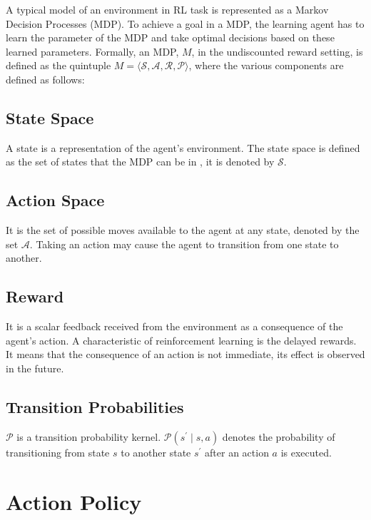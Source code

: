 A typical model of an environment in RL task is represented as a Markov Decision Processes (MDP).
To achieve a goal in a MDP, the learning agent has to learn the parameter of the MDP and take optimal decisions based on these learned parameters.
Formally, an MDP, $M$, in the undiscounted reward setting, is defined as the quintuple $M = \langle \mathcal{S}, \mathcal{A}, \mathcal{R}, \mathcal{P} \rangle$, where the various components are defined as follows:

\subsection{State Space}

A state is a representation of the agent's environment.
The state space is defined as the set of states that the MDP can be in , it is denoted by $\mathcal{S}$.

\subsection{Action Space}

It is the set of possible moves available to the agent at any state, denoted by the set $\mathcal{A}$.
Taking an action may cause the agent to transition from one state to another.

\subsection{Reward}

It is a scalar feedback received from the environment as a consequence of the agent's action.
A characteristic of reinforcement learning is the delayed rewards.
It means that the consequence of an action is not immediate, its effect is observed in the future.

\subsection{Transition Probabilities}

$\mathcal{P}$ is a transition probability kernel.
$\mathcal{P}(s^\prime \mid s, a)$ denotes the probability of transitioning from state $s$ to another state $s^\prime$ after an action $a$ is executed.

\section{Action Policy}

